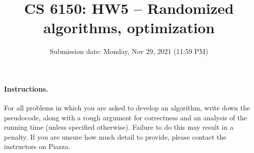 \documentclass[addpoints, 11pt]{exam}
\title{CS 6150: HW5 -- Randomized algorithms, optimization}
\date{Submission date: Monday, Nov 29, 2021 (11:59 PM)}
\begin{document}
\maketitle
\begin{center}
\end{center}

\pointname{}
\bonuspointname{}
\pointformat{[\bfseries\thepoints]}

\begin{center}
  \gradetable
\end{center}
\newpage
\paragraph{Instructions.}  For all problems in which you are asked to develop an algorithm, write down the pseudocode, along with a rough argument for correctness and an analysis of the running time (unless specified otherwise). Failure to do this may result in a penalty. If you are unsure how much detail to provide, please contact the instructors on Piazza.
\end{document}
